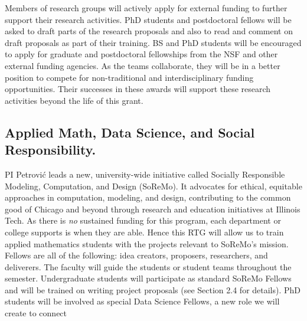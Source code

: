 \documentclass[11pt]{NSFamsart}
\begin{document}
Members of research groups will actively apply for external funding to further support their research activities.  PhD students and postdoctoral fellows will be asked to draft parts of the research proposals and also to read and comment on draft proposals as part of their training.  BS and PhD students will be encouraged to apply for graduate and postdoctoral fellowships from the NSF and other external funding agencies.  As the teams collaborate, they will be in a better position to compete for  non-traditional and interdisciplinary funding opportunities.  Their successes in these awards will support these research activities beyond the life of this grant.

\subsection*{Applied Math, Data Science, and Social Responsibility.} 
PI  Petrovi\'c  leads a new, university-wide initiative called Socially Responsible Modeling, Computation, and Design (SoReMo).  It advocates for ethical, equitable approaches in computation, modeling, and design, contributing to the common good of Chicago and beyond through research and education initiatives at Illinois Tech. As there is \emph{no} sustained funding for this program, each department or college supports is when they are able. Hence this RTG will allow us to  train applied mathematics students with the projects relevant to SoReMo's mission.  Fellows are all of the following: idea creators, proposers, researchers, and deliverers. The faculty will guide the students or student teams throughout the semester. Undergraduate students will participate as standard SoReMo Fellows and will be trained on writing project proposals (see Section 2.4 for details). PhD students will be involved as special Data Science Fellows,  a new role we will create to connect 
\end{document}
